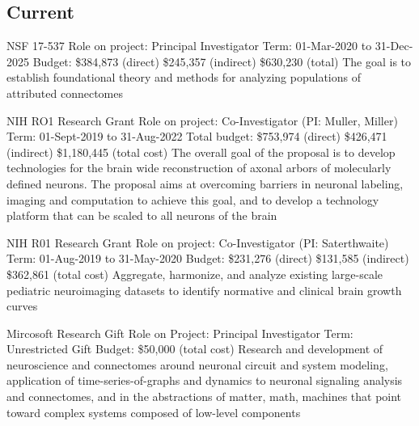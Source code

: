 \documentclass[10pt,colorlinks=true,urlcolor=blue]{moderncv}
\begin{document}
\subsection{Current}

{\newline NSF 17-537
\newline Role on project: Principal Investigator
\newline Term: {01-Mar-2020} to 31-Dec-2025
\newline Budget: \$384,873 (direct) \$245,357 (indirect) \$630,230 (total)
\newline The goal is to establish foundational theory and methods for analyzing populations of
attributed connectomes}{}{}{}{}

{\newline NIH RO1 Research Grant
\newline Role on project: Co-Investigator (PI: Muller, Miller)
\newline Term: 01-Sept-2019 to 31-Aug-2022
\newline Total budget: \$753,974 (direct) \$426,471 (indirect) \$1,180,445 (total cost)
\newline The overall goal of the proposal is to develop technologies for the brain wide reconstruction
of axonal arbors of molecularly defined neurons. The proposal aims at overcoming barriers
in neuronal labeling, imaging and computation to achieve this goal, and to develop a
technology platform that can be scaled to all neurons of the brain}{}{}{}{}

{\newline NIH R01 Research Grant 
\newline Role on project: Co-Investigator (PI: Saterthwaite)
\newline Term: 01-Aug-2019 to 31-May-2020
\newline Budget: \$231,276 (direct) \$131,585 (indirect) \$362,861 (total cost)
\newline Aggregate, harmonize, and analyze existing large-scale pediatric neuroimaging datasets to
identify normative and clinical brain growth curves}{}{}{}{}

{\newline Mircosoft Research Gift
\newline Role on Project: Principal Investigator
\newline Term: Unrestricted Gift
\newline Budget: \$50,000 (total cost)
\newline Research and development of neuroscience and connectomes around neuronal circuit and
system modeling, application of time-series-of-graphs and dynamics to neuronal signaling
analysis and connectomes, and in the abstractions of matter, math, machines that point
toward complex systems composed of low-level components}{}{}{}{}
\end{document}
